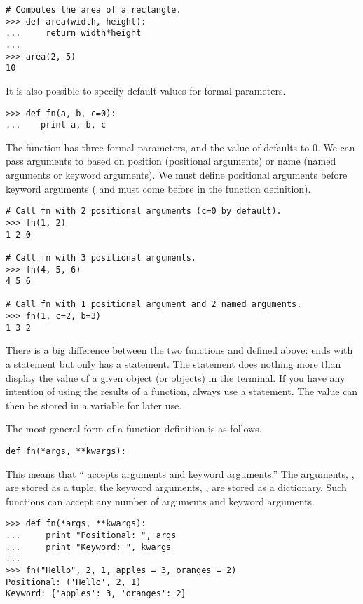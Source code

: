 \begin{lstlisting}
# Computes the area of a rectangle.
>>> def area(width, height):
...     return width*height
...         
>>> area(2, 5)
10
\end{lstlisting}

It is also possible to specify default values for formal parameters.
\begin{lstlisting}
>>> def fn(a, b, c=0):
...    print a, b, c
\end{lstlisting} %
The function  has three formal parameters, and the value of  defaults to 0.
We can pass arguments to  based on position (positional arguments) or name (named arguments or keyword arguments). We must define positional arguments before keyword arguments ( and  must come before  in the function definition).
\begin{lstlisting}
# Call fn with 2 positional arguments (c=0 by default).
>>> fn(1, 2)
1 2 0

# Call fn with 3 positional arguments.
>>> fn(4, 5, 6)
4 5 6

# Call fn with 1 positional argument and 2 named arguments.
>>> fn(1, c=2, b=3)
1 3 2
\end{lstlisting}


There is a big difference between the two functions  and  defined above:  ends with a  statement but  only has a  statement.
The  statement does nothing more than display the value of a given object (or objects) in the terminal.
If you have any intention of using the results of a function, always use a  statement.
The value can then be stored in a variable for later use.

The most general form of a function definition is as follows.
\begin{lstlisting}
def fn(*args, **kwargs):
\end{lstlisting}
This means that `` accepts arguments and keyword arguments.''
The arguments, , are stored as a tuple; the keyword arguments, , are stored as a dictionary.
Such functions can accept any number of arguments and keyword arguments.
\begin{lstlisting}
>>> def fn(*args, **kwargs):
...     print "Positional: ", args
...     print "Keyword: ", kwargs
...     
>>> fn("Hello", 2, 1, apples = 3, oranges = 2)
Positional: ('Hello', 2, 1)
Keyword: {'apples': 3, 'oranges': 2}
\end{lstlisting}

